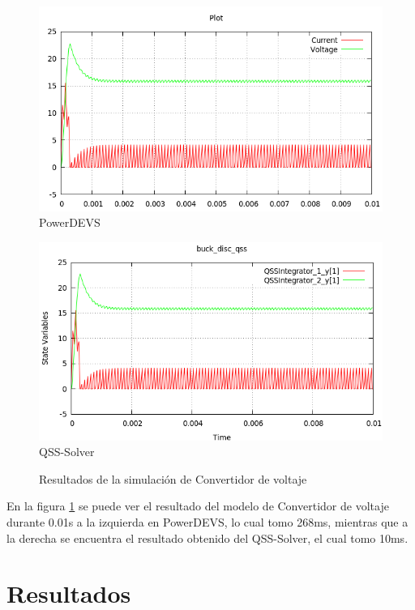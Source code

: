 \begin{figure}[H]
\begin{minipage}{0.5\textwidth}
 \includegraphics[width=\linewidth]{buck_disk-pd}
\centering
PowerDEVS
\label{model:buckdisk_coupled0}
\end{minipage}\hfill
\begin{minipage}{0.5\textwidth}
 \includegraphics[width=\linewidth]{buck_disk-qss}
\centering
QSS-Solver
\label{model:buckdisk}
\end{minipage}
\caption{Resultados de la simulación de Convertidor de voltaje}
\end{figure}

En la figura \ref{model:buckdisk} se puede ver el resultado del modelo de Convertidor de voltaje durante 0.01s a la izquierda en PowerDEVS, lo cual tomo 268ms, 
mientras que a la derecha se encuentra el resultado obtenido del QSS-Solver, el cual tomo 10ms.

\section{Resultados}

